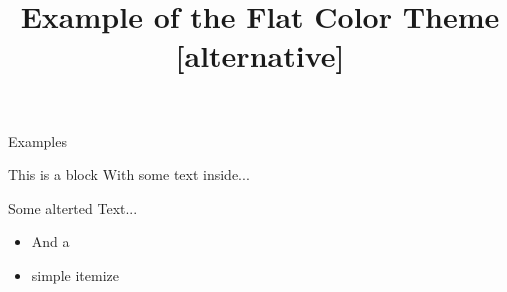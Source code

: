 \documentclass[12pt,a4paper]{beamer}
\title{Example of the Flat Color Theme [alternative]}
\begin{document}
	\begin{frame}{}
		\maketitle
	\end{frame}
	\begin{frame}{Examples}
		\begin{block}{This is a block}
			With some text inside...
		\end{block}
		\alert{Some alterted Text...}
		\begin{itemize}
			\item And a
			\item simple itemize
		\end{itemize}
	\end{frame}
\end{document}
